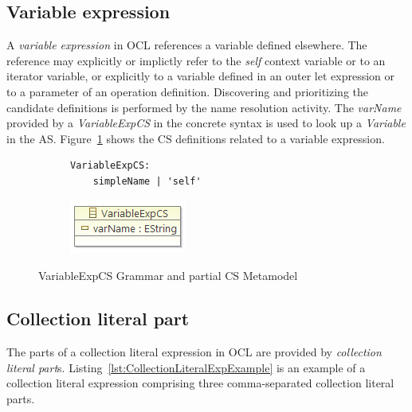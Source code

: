 \documentclass{llncs}
\begin{document}
\subsection{Variable expression}

A \textit{variable expression} in OCL references a variable defined elsewhere. The reference may explicitly or implictly refer to the \emph{self} context variable or to an iterator variable, or explicitly to a variable defined in an outer let expression or to a parameter of an operation definition. Discovering and prioritizing the candidate definitions is performed by the name resolution activity. The \emph{varName} provided by a \emph{VariableExpCS} in the concrete syntax is used to look up a \emph{Variable} in the AS. Figure~\ref{fig:VariableExpCS} shows the CS definitions related to a variable expression. 

\begin{figure}[htbp]
\centering
\begin{subfigure}{0.5\textwidth}
  \centering
 \begin{lstlisting}[label=lst:VariableExpEBNF, language=Xtext]
 VariableExpCS:
 	simpleName | 'self'
 \end{lstlisting} 
\end{subfigure}%
\begin{subfigure}{0.5\textwidth}
  \centering
  \includegraphics[scale=0.75]{images/VariableExpCS.png}
\end{subfigure}
\caption{VariableExpCS Grammar and partial CS Metamodel}
\label{fig:VariableExpCS}
\end{figure}

\subsection{Collection literal part}

The parts of a collection literal expression in OCL are provided by \textit{collection literal part}s. Listing~\ref{lst:CollectionLiteralExpExample} is an example of a collection literal expression comprising three comma-separated collection literal parts.
\end{document}
